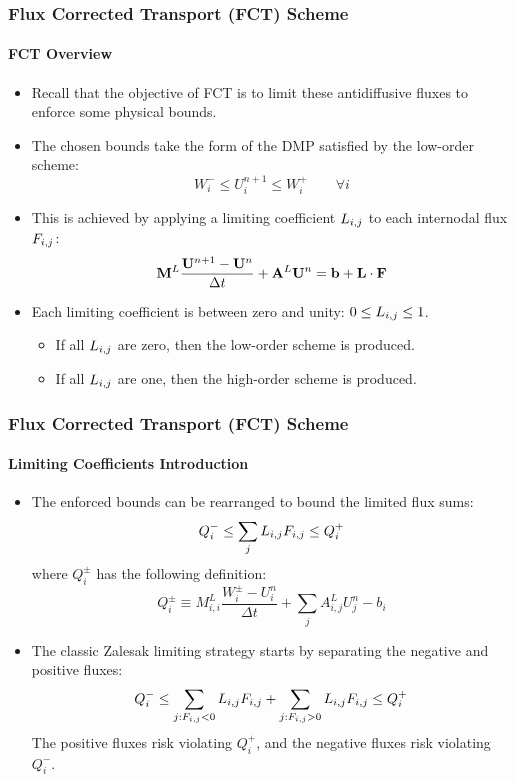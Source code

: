 \documentclass{beamer}
\begin{document}
\begin{frame}
\frametitle{Flux Corrected Transport (FCT) Scheme}
\framesubtitle{FCT Overview}

\begin{itemize}
   \item Recall that the objective of FCT is to limit these antidiffusive
      fluxes to enforce some physical bounds.
   \item The chosen bounds take the form of the DMP satisfied by the
      low-order scheme:
      \begin{equation}
         W_i^-\leq
         U_i^{n+1}\leq
         W_i^+\qquad\forall i
      \end{equation}
   \item This is achieved by applying a limiting coefficient $L_{i,j}$ to each
      internodal flux $F_{i,j}$:
      \begin{equation}
         \mathbf{M}^L\frac{\mathbf{U}^{n+1}-\mathbf{U}^n}{\Delta t} + \mathbf{A}^L\mathbf{U}^n = \mathbf{b} + \mathbf{L}\cdot\mathbf{F}
      \end{equation}
   \item Each limiting coefficient is between zero and unity: $0\leq L_{i,j}\leq 1$.
   \begin{itemize}
      \item If all $L_{i,j}$ are zero, then the low-order scheme is produced.
      \item If all $L_{i,j}$ are one, then the high-order scheme is produced.
   \end{itemize}
\end{itemize}

\end{frame}
\begin{frame}
\frametitle{Flux Corrected Transport (FCT) Scheme}
\framesubtitle{Limiting Coefficients Introduction}

\begin{itemize}
   \item The enforced bounds can be rearranged to bound the limited flux sums:
      \begin{equation}
         Q^-_i \leq \sum\limits_j L_{i,j} F_{i,j} \leq Q^+_i
      \end{equation}
      where $Q_i^\pm$ has the following definition:
      \begin{equation}
         Q_i^\pm \equiv M_{i,i}^L\frac{W_i^\pm-U_i^n}{\Delta t}
         + \sum\limits_j A_{i,j}^L U_j^n - b_i
      \end{equation}
   \item The classic Zalesak limiting strategy starts by separating the
      negative and positive fluxes:
      \begin{equation}
         Q^-_i \leq \sum\limits_{j:F_{i,j}<0} L_{i,j} F_{i,j} +
            \sum\limits_{j:F_{i,j}>0} L_{i,j} F_{i,j}\leq Q^+_i
      \end{equation}
      The positive fluxes risk violating $Q_i^+$, and the negative fluxes risk
      violating $Q_i^-$.
\end{itemize}

\end{frame}
\end{document}

